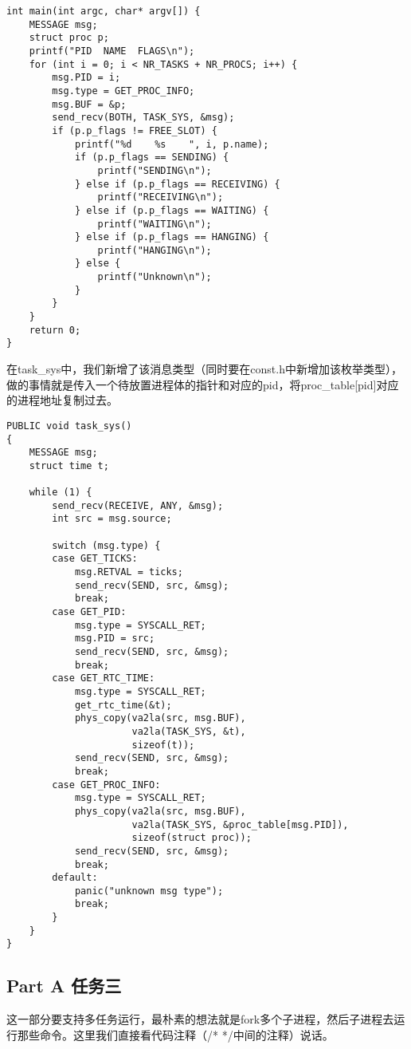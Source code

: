 \documentclass{whureport}
\begin{document}
\begin{lstlisting}
int main(int argc, char* argv[]) {
    MESSAGE msg;
    struct proc p;
    printf("PID  NAME  FLAGS\n");
    for (int i = 0; i < NR_TASKS + NR_PROCS; i++) {
        msg.PID = i;
        msg.type = GET_PROC_INFO;
        msg.BUF = &p;
        send_recv(BOTH, TASK_SYS, &msg);
        if (p.p_flags != FREE_SLOT) {
            printf("%d    %s    ", i, p.name);
            if (p.p_flags == SENDING) {
                printf("SENDING\n");
            } else if (p.p_flags == RECEIVING) {
                printf("RECEIVING\n");
            } else if (p.p_flags == WAITING) {
                printf("WAITING\n");
            } else if (p.p_flags == HANGING) {
                printf("HANGING\n");
            } else {
                printf("Unknown\n");
            }
        }
    }
    return 0;
}
\end{lstlisting}

在task\_sys中，我们新增了该消息类型（同时要在const.h中新增加该枚举类型），做的事情就是传入一个待放置进程体的指针和对应的pid，将proc\_table[pid]对应的进程地址复制过去。

\begin{lstlisting}
PUBLIC void task_sys()
{
	MESSAGE msg;
	struct time t;

	while (1) {
		send_recv(RECEIVE, ANY, &msg);
		int src = msg.source;

		switch (msg.type) {
		case GET_TICKS:
			msg.RETVAL = ticks;
			send_recv(SEND, src, &msg);
			break;
		case GET_PID:
			msg.type = SYSCALL_RET;
			msg.PID = src;
			send_recv(SEND, src, &msg);
			break;
		case GET_RTC_TIME:
			msg.type = SYSCALL_RET;
			get_rtc_time(&t);
            phys_copy(va2la(src, msg.BUF),
                      va2la(TASK_SYS, &t),
					  sizeof(t));
			send_recv(SEND, src, &msg);
            break;
        case GET_PROC_INFO:
            msg.type = SYSCALL_RET;
            phys_copy(va2la(src, msg.BUF),
                      va2la(TASK_SYS, &proc_table[msg.PID]),
                      sizeof(struct proc));
            send_recv(SEND, src, &msg);
            break;
        default:
			panic("unknown msg type");
			break;
		}
	}
}
\end{lstlisting}

\subsection{Part A 任务三}
这一部分要支持多任务运行，最朴素的想法就是fork多个子进程，然后子进程去运行那些命令。这里我们直接看代码注释（/* */中间的注释）说话。
\end{document}
